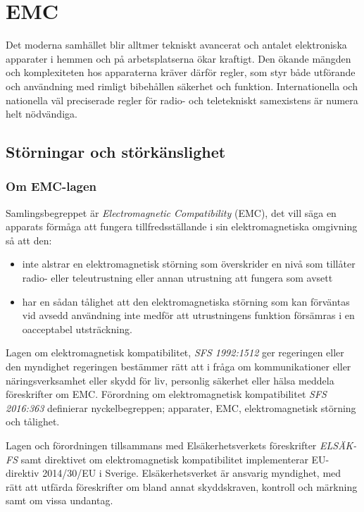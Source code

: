 \chapter{EMC}
\label{EMC}

Det moderna samhället blir alltmer tekniskt avancerat och antalet elektroniska
apparater i hemmen och på arbetsplatserna ökar kraftigt.
Den ökande mängden och komplexiteten hos apparaterna kräver därför regler, som
styr både utförande och användning med rimligt bibehållen säkerhet och funktion.
Internationella och nationella väl preciserade regler för radio- och
teletekniskt samexistens är numera helt nödvändiga.

\section{Störningar och störkänslighet}

\subsection{Om EMC-lagen}
\label{EMC-lagen}

Samlingsbegreppet är \emph{Electromagnetic Compatibility} (EMC), det vill säga
en apparats förmåga att fungera tillfredsställande i sin elektromagnetiska
omgivning så att den:

\begin{itemize}
\item inte alstrar en elektromagnetisk störning som överskrider en nivå som
  tillåter radio- eller teleutrustning eller annan utrustning att fungera som
  avsett

\item har en sådan tålighet att den elektromagnetiska störning som kan
  förväntas vid avsedd användning inte medför att utrustningens funktion
  försämras i en oacceptabel utsträckning.
\end{itemize}

Lagen om elektromagnetisk kompatibilitet, \emph{SFS 1992:1512} \cite{SFS1992:1512}
ger regeringen eller den myndighet regeringen bestämmer rätt att i fråga om
kommunikationer eller näringsverksamhet eller skydd för liv, personlig säkerhet
eller hälsa meddela föreskrifter om EMC.
Förordning om elektromagnetisk kompatibilitet \emph{SFS 2016:363}
\cite{SFS2016:363} definierar nyckelbegreppen; apparater, EMC, elektromagnetisk
störning och tålighet.

Lagen och förordningen tillsammans med Elsäkerhetsverkets föreskrifter
\emph{ELSÄK-FS} samt direktivet om elektromagnetisk kompatibilitet implementerar
EU-direktiv 2014/30/EU i Sverige.
Elsäkerhetsverket är ansvarig myndighet, med rätt att utfärda föreskrifter om
bland annat skyddskraven, kontroll och märkning samt om vissa undantag.

